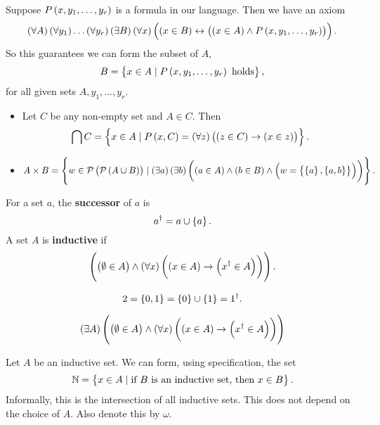 \pagebreak

\begin{axiom}
Suppose $ P\br{x, y_1, \dots, y_r} $ is a formula in our language. Then we have an axiom
$$ \fab{A}\fab{y_1} \dots \fab{y_r}\teb{B}\fab{x}\iffb{\inb{x}{B}}{\andb{\inb{x}{A}}{P\br{x, y_1, \dots, y_r}}}. $$
So this guarantees we can form the subset of $ A $,
$$ B = \cbr{x \in A \mid P\br{x, y_1, \dots, y_r} \ \text{holds}}, $$
for all given sets $ A, y_1, \dots, y_r $.
\end{axiom}

\begin{example*}
\hfill
\begin{itemize}
\item Let $ C $ be any non-empty set and $ A \in C $. Then
$$ \bigcap C = \cbr{x \in A \mid P\br{x, C} = \fab{z}\impb{\inb{z}{C}}{\inb{x}{z}}}. $$
\item
$$ A \times B = \cbr{w \in \PP\br{\PP\br{A \cup B}} \mid \teb{a}\teb{b}\br{\inb{a}{A} \land \inb{b}{B} \land \eqb{w}{\cbr{\cbr{a}, \cbr{a, b}}}}}. $$
\end{itemize}
\end{example*}

\begin{definition}
For a set $ a $, the \textbf{successor} of $ a $ is
$$ a^\dagger = a \cup \cbr{a}. $$
A set $ A $ is \textbf{inductive} if
$$ \andb{\inb{\emptyset}{A}}{\fab{x}\impb{\inb{x}{A}}{\inb{x^\dagger}{A}}}. $$
\end{definition}

\begin{example*}
$$ 2 = \cbr{0, 1} = \cbr{0} \cup \cbr{1} = 1^\dagger. $$
\end{example*}

\begin{axiom}
$$ \teb{A}\andb{\inb{\emptyset}{A}}{\fab{x}\impb{\inb{x}{A}}{\inb{x^\dagger}{A}}} $$
\end{axiom}

\begin{definition}
Let $ A $ be an inductive set. We can form, using specification, the set
$$ \N = \cbr{x \in A \mid \text{if} \ B \ \text{is an inductive set, then} \ x \in B}. $$
Informally, this is the intersection of all inductive sets. This does not depend on the choice of $ A $. Also denote this by $ \omega $.
\end{definition}

